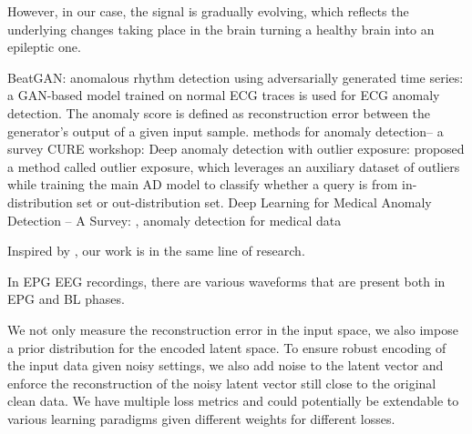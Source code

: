 \documentclass[pmlr]{jmlr}%
\begin{document}



However, in our case, the signal is gradually evolving, which reflects the underlying changes taking place in the brain turning a healthy brain into an epileptic one. 













\cite{zhou2019beatgan} BeatGAN: anomalous rhythm detection using adversarially generated time series: a GAN-based model trained on normal ECG traces is used for ECG anomaly detection. The anomaly score is defined as reconstruction error between the generator's output of a given input sample.
\cite{kalinichenko2014methods} methods for anomaly detection-- a survey CURE workshop:	
\cite{hendrycks2018deep} Deep anomaly detection with outlier exposure: proposed a method called outlier exposure, which leverages an auxiliary dataset of outliers while training the main AD model to classify whether a query is from in-distribution set or out-distribution set.
\cite{2020Deep} Deep Learning for Medical Anomaly Detection -- A Survey: , 
\cite{Salem2013SensorFA} anomaly detection for medical data 


Inspired by \cite{makhzani2015adversarial}, our work is in the same line of research.



In EPG EEG recordings, there are various waveforms that are present both in EPG and BL phases.


We not only measure the reconstruction error in the input space, we also impose a prior distribution for the encoded latent space. To ensure robust encoding of the input data given noisy settings, we also add noise to the latent vector and enforce the reconstruction of the noisy latent vector still close to the original clean data. We have multiple loss metrics and could potentially be extendable to various learning paradigms given different weights for different losses.
\end{document}
